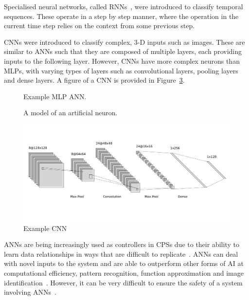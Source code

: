 Specialised neural networks, called \acfp{RNN}~\cite{medsker2001recurrent}, were introduced to classify temporal sequences. 
These operate in a step by step manner, where the operation in the current time step relies on the context from some previous step.

\acp{CNN} were introduced to classify complex, 3-D inputs such as images.
These are similar to \acp{ANN} such that they are composed of multiple layers, each providing inputs to the following layer. 
However, \acp{CNN} have more complex neurons than \acp{MLP}, with varying types of layers such as convolutional layers, pooling layers and dense layers.
A figure of a \ac{CNN} is provided in Figure~\ref{fig:cnn}.

\begin{figure}
	\centering
	\scalebox{0.8}{}
	\caption{Example \ac{MLP} \ac{ANN}.	\label{fig:mlp-ann}}
\end{figure}
\begin{figure}
	\centering
	\scalebox{0.8}{}
	\caption{A model of an artificial neuron. \label{fig:artificial-neuron}}
\end{figure}
\begin{figure}
	\centering
	\includegraphics[width=\textwidth]{Content/fig/cnn-img.pdf}
	\caption{Example \ac{CNN} \label{fig:cnn}}
\end{figure}

\acp{ANN} are being increasingly used as controllers in \acp{CPS} due to their ability to learn data relationships in ways that are difficult to replicate~\cite{ANNSafety2007}. 
\acp{ANN} can deal with novel inputs to the system and are able to outperform other forms of \ac{AI} at computational efficiency, pattern recognition, function approximation and image identification~\cite{AIComp2016, AIComp2017}. 
However, it can be very difficult to ensure the safety of a system involving \acp{ANN}~\cite{ANNSafety2007, ANNSafety2018}.

